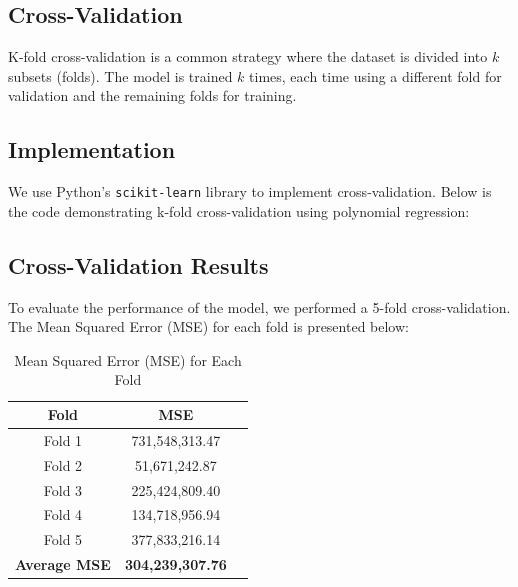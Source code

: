 \documentclass[12pt]{book} %
\begin{document}



\subsection{Cross-Validation}
K-fold cross-validation is a common strategy where the dataset is divided into \(k\) subsets (folds). The model is trained \(k\) times, each time using a different fold for validation and the remaining folds for training. 

\subsection{Implementation}
We use Python's \texttt{scikit-learn} library to implement cross-validation. Below is the code demonstrating k-fold cross-validation using polynomial regression:
\subsection{Cross-Validation Results}

To evaluate the performance of the model, we performed a 5-fold cross-validation. The Mean Squared Error (MSE) for each fold is presented below:

\begin{table}[h!]
    \centering
    \begin{tabular}{@{}ccc@{}}
        \toprule
        \textbf{Fold} & \textbf{MSE} \\ \midrule
        Fold 1 & 731,548,313.47 \\
        Fold 2 & 51,671,242.87 \\
        Fold 3 & 225,424,809.40 \\
        Fold 4 & 134,718,956.94 \\
        Fold 5 & 377,833,216.14 \\ \midrule
        \textbf{Average MSE} & \textbf{304,239,307.76} \\ \bottomrule
    \end{tabular}
    \caption{Mean Squared Error (MSE) for Each Fold}
    \label{tab:mse_results}
\end{table}
\end{document}
